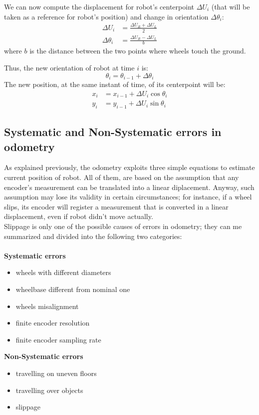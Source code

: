 \documentclass[a4paper, onecolumn]{report}
\begin{document}
We can now compute the displacement for robot's centerpoint $\Delta U_i$ (that will be taken as a reference for robot's position) and change in orientation $\Delta \theta_i$:
\begin{equation}
	\begin{aligned}
		\Delta U_i &= \frac{\Delta U_R + \Delta U_L}{2}  \\
		\Delta \theta_i &= \frac{\Delta U_R - \Delta U_L}{b}
	\end{aligned}				
\end{equation}
where $b$ is the distance between the two points where wheels touch the ground. 

Thus, the new orientation of robot at time $i$ is:
\begin{equation}
	\theta_i = \theta_{i-1} + \Delta \theta_i
\end{equation}
The new position, at the same instant of time, of its centerpoint will be:
\begin{equation}
	\begin{aligned}
		x_i &= x_{i-1} + \Delta U_i \cos \theta_i \\
		y_i &= y_{i-1} + \Delta U_i \sin \theta_i
	\end{aligned}
\end{equation}

\subsection{Systematic and Non-Systematic errors in odometry}
As explained previously, the odometry exploits three simple equations to estimate current position of robot. All of them, are based on the assumption that any encoder's measurement can be translated into a linear diplacement. Anyway, such assumption may lose its validity in certain circumstances; for instance, if a wheel slips, its encoder will register a measurement that is converted in a linear displacement, even if robot didn't move actually. \\
Slippage is only one of the possible causes of errors in odometry; they can me summarized and divided into the following two categories:\\ \\
\textbf{Systematic errors}
\begin{itemize}
	\item{wheels with different diameters}
	\item{wheelbase different from nominal one}
	\item{wheels misalignment}
	\item{finite encoder resolution}
	\item{finite encoder sampling rate}
\end{itemize} 
\textbf{Non-Systematic errors}
\begin{itemize}
	\item{travelling on uneven floors}
	\item{travelling over objects}
	\item{slippage}
\end{itemize}
\end{document}
